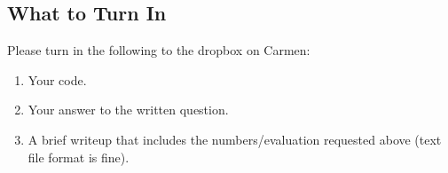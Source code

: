 \documentclass[12pt, letterpaper]{article}
\begin{document}
\subsection*{What to Turn In}
Please turn in the following to the dropbox on Carmen:

\begin{enumerate}
  \item Your code.
  \item Your answer to the written question.
  \item A brief writeup that includes the numbers/evaluation requested above (text file format is fine).
\end{enumerate}
\end{document}

